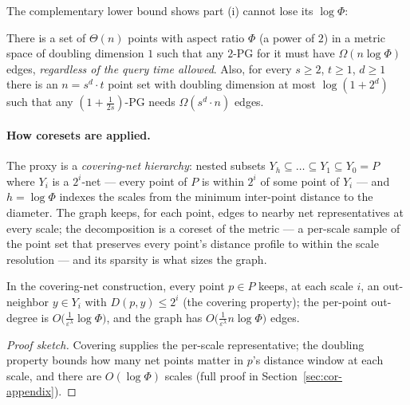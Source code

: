 The complementary lower bound shows part (i) cannot lose its
$\log\Phi$:

\begin{theorem}\label{thm:cor-pg-lb}
There is a set of $\Theta(n)$ points with aspect ratio $\Phi$ (a power
of $2$) in a metric space of doubling dimension $1$ such that any
$2$-PG for it must have $\Omega(n\log\Phi)$ edges, \emph{regardless of
the query time allowed}. Also, for every $s \ge 2$, $t \ge 1$,
$d \ge 1$ there is an $n = s^d \cdot t$ point set with doubling
dimension at most $\log(1+2^d)$ such that any
$(1+\tfrac{1}{2s})$-PG needs $\Omega(s^d \cdot n)$ edges. \eop
\end{theorem}

\paragraph{How coresets are applied.}
The proxy is a \emph{covering-net hierarchy}: nested subsets $Y_h
\subseteq \dots \subseteq Y_1 \subseteq Y_0 = P$ where $Y_i$ is a
$2^i$-net --- every point of $P$ is within $2^i$ of some point of
$Y_i$ --- and $h = \log\Phi$ indexes the scales from the minimum
inter-point distance to the diameter. The graph keeps, for each point,
edges to nearby net representatives at every scale; the decomposition
is a coreset of the metric --- a per-scale sample of the point set that
preserves every point's distance profile to within the scale
resolution --- and its sparsity is what sizes the graph.

\begin{lemma}\label{lem:cor-pg-net}
In the covering-net construction, every point $p \in P$ keeps, at each
scale $i$, an out-neighbor $y \in Y_i$ with $D(p,y) \le 2^i$ (the
covering property); the per-point out-degree is
$O\bigl(\tfrac{1}{\varepsilon^\lambda}\log\Phi\bigr)$, and the graph
has $O\bigl(\tfrac{1}{\varepsilon^\lambda} n\log\Phi\bigr)$ edges.
\eop
\end{lemma}

\begin{proof}[Proof sketch]
Covering supplies the per-scale representative; the doubling property
bounds how many net points matter in $p$'s distance window at each
scale, and there are $O(\log\Phi)$ scales (full proof in
Section~\ref{sec:cor-appendix}).
\end{proof}

